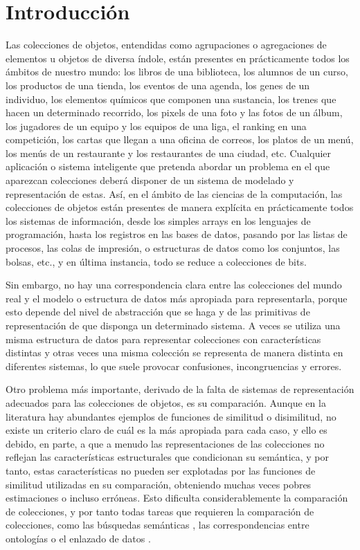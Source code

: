 \documentclass[a4paper,10pt,twoside]{article}
\theoremstyle{definition}
\begin{document}
\section{Introducción}
Las colecciones de objetos, entendidas como agrupaciones o agregaciones de elementos u objetos de diversa índole, están presentes en prácticamente todos los ámbitos de nuestro mundo: los libros de una biblioteca, los alumnos de un curso, los productos de una tienda, los eventos de una agenda, los genes de un individuo, los elementos químicos que componen una sustancia, los trenes que hacen un determinado recorrido, los pixels de una foto y las fotos de un álbum, los jugadores de un equipo y los equipos de una liga, el ranking en una competición, los cartas que llegan a una oficina
de correos, los platos de un menú, los menús de un restaurante y los restaurantes de una ciudad, etc.
Cualquier aplicación o sistema inteligente que pretenda abordar un problema en el que aparezcan colecciones deberá disponer de un sistema de modelado y representación de estas.
Así, en el ámbito de las ciencias de la computación, las colecciones de objetos están presentes de manera explícita en prácticamente todos los sistemas de información, desde los simples arrays en los lenguajes de programación, hasta los registros en las bases de datos, pasando por las listas de procesos, las colas de impresión, o estructuras de datos como los conjuntos, las bolsas, etc., y en última instancia, todo se reduce a colecciones de bits. 

Sin embargo, no hay una correspondencia clara entre las colecciones del mundo real y el modelo o estructura de datos más apropiada para representarla, porque esto depende del nivel de abstracción que se haga y de las primitivas de representación de que disponga un determinado sistema. 
A veces se utiliza una misma estructura de datos para representar colecciones con características distintas y otras veces una misma colección se representa de manera distinta en diferentes sistemas, lo que suele provocar confusiones, incongruencias y errores.

Otro problema más importante, derivado de la falta de sistemas de representación adecuados para las colecciones de objetos, es su comparación.
Aunque en la literatura hay abundantes ejemplos de funciones de similitud o disimilitud, no existe un criterio claro de cuál es la más apropiada para cada caso, y ello es debido, en parte, a que a menudo las representaciones de las colecciones no reflejan las características estructurales que condicionan su semántica, y por tanto, estas características no pueden ser explotadas por las funciones de similitud utilizadas en su comparación, obteniendo muchas veces pobres estimaciones o incluso erróneas. 
Esto dificulta considerablemente la comparación de colecciones, y por tanto todas tareas que requieren la comparación de colecciones, como las búsquedas semánticas \cite{hendler2010semantic,wei2009semantic}, las correspondencias entre ontologías \cite{euzenat2007ontology} o el enlazado de datos \cite{bizer2009linked}.
\end{document}
